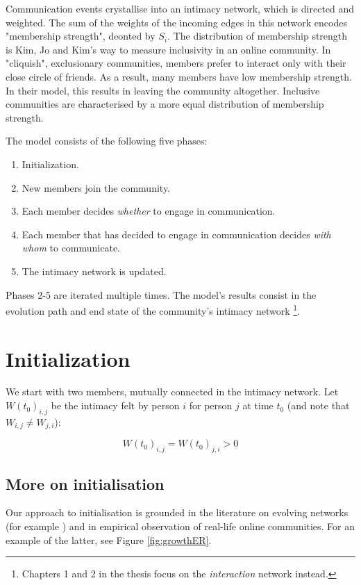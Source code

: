 \documentclass{article}
\begin{document}
Communication events crystallise into an intimacy network, which is directed and weighted. The sum of the weights of the incoming edges in this network encodes "membership strength", deonted by $S_i$. The distribution of membership strength is Kim, Jo and Kim's way to measure inclusivity in an online community. In "cliquish", exclusionary communities, members prefer to interact only with their close circle of friends. As a result, many members have low membership strength. In their model, this results in leaving the community altogether. Inclusive communities are characterised by a more equal distribution of membership strength. 

The model consists of the following five phases:

\begin{enumerate}
	\item Initialization.
	\item New members join the community.
	\item Each member decides \textit{whether} to engage in communication.
	\item Each member that has decided to engage in communication decides \textit{with whom} to communicate.
	\item The intimacy network is updated.
\end{enumerate}

Phases 2-5 are iterated multiple times. The model's results consist in the evolution path and end state of the community's intimacy network \footnote{Chapters 1 and 2 in the thesis focus on the \textit{interaction} network instead.}.

\section{Initialization}

We start with two members, mutually connected in the intimacy network. Let $W(t_0)_{i,j}$ be the intimacy felt by person $i$ for person $j$ at time $t_0$ (and note that $W_{i,j} \neq W_{j,i}$):

\begin{equation}
	W(t_0)_{i,j} = W(t_0)_{j,i} > 0	
\end{equation}

\subsection{More on initialisation}

Our approach to initialisation is grounded in the literature on evolving networks (for example \cite{barabasi1999emergence}) and in empirical observation of real-life online communities. For an example of the latter, see Figure \ref{fig:growthER}. 
\end{document}
